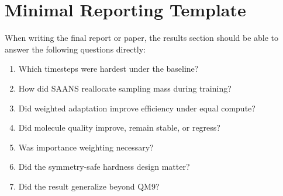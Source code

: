 \documentclass[11pt]{report}
\begin{document}
\chapter{Minimal Reporting Template}

When writing the final report or paper, the results section should be able to answer the following questions directly:

\begin{enumerate}[leftmargin=2em]
    \item Which timesteps were hardest under the baseline?
    \item How did SAANS reallocate sampling mass during training?
    \item Did weighted adaptation improve efficiency under equal compute?
    \item Did molecule quality improve, remain stable, or regress?
    \item Was importance weighting necessary?
    \item Did the symmetry-safe hardness design matter?
    \item Did the result generalize beyond QM9?
\end{enumerate}
\end{document}
